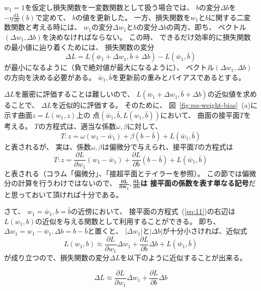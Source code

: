 $w_1 = 1$を仮定し損失関数を一変数関数として扱う場合では、
$b$の変分$\Delta b$を$-\eta\frac{dL}{db}(b)$で定めて、
$b$の値を更新した。
一方、損失関数を$w_1$と$b$に関する二変数関数と考える時には、
$w_1$の変分$\Delta w_1$と$b$の変分$\Delta b$の両方、即ち、
ベクトル$(\Delta w_1, \Delta b)$を決めなければならない。
この時、
できるだけ効率的に損失関数の最小値に辿り着くためには、
損失関数の変分
\[
  \Delta L = L(\bar w_1 + \Delta w_1, \bar b + \Delta b)
  - L(\bar w_1, \bar b)
\]
が最小になるように（負で絶対値が最大になるように）、
ベクトル$(\Delta w_1, \Delta b)$の方向を決める必要がある。
$\bar w_1, \bar b$を更新前の重みとバイアスであるとする。

$\Delta L$を厳密に評価することは難しいので、
$L(\bar w_1 + \Delta w_1, \bar b + \Delta b)$の近似値を求めることで、
$\Delta L$を近似的に評価する。
そのために、
図~\ref{fig:rss-weight-bias}~(a)に示す曲面$z = L(w_1, z)$上の
点$(\bar w_1, \bar b, L(w_1, \bar b))$において、
曲面の接平面$T$を考える。
$T$の方程式は、適当な係数$\omega, \beta$に対して、
\[
T: z = \omega (w_1 - \bar w_1) + \beta (b - \bar b) + L(\bar w_1, \bar b)
\]
と表されるが、
実は、係数$\omega, \beta$は偏微分で与えられ、接平面$T$の方程式は
\begin{equation}\label{eq:11}
  T: z = \frac{\partial L}{\partial w_1} (w_1 - \bar w_1)
  + \frac{\partial L}{\partial b} (b - \bar b) + L(\bar w_1, \bar b)
\end{equation}
と表される（コラム「偏微分」、「接超平面とテイラーを参照）。
この節では偏微分の計算を行うわけではないので、
\textbf{$\boldsymbol{\frac{\partial L}{\partial w_1}, \frac{\partial L}{\partial b}}$は
接平面の係数を表す単なる記号}だと思っておいて頂ければ十分である。

さて、
$w_1 = \bar w_1, b = \bar b$の近傍において、
接平面の方程式~(\ref{eq:11})の右辺は$L(w_1, b)$の近似を与える関数として利用することができる。
即ち、
$\Delta w_1 = w_1 - \bar w_1, \Delta b = b - \bar b$と置くと、
$\vert\Delta w_1\vert$と$\vert\Delta b\vert$が十分小さければ、近似式
\[
  L(w_1, b) \approx \frac{\partial L}{\partial w_1} \Delta w_1
  + \frac{\partial L}{\partial b} \Delta b + L(\bar w_1, \bar b)
\]
が成り立つので、損失関数の変分$\Delta L$を以下のように近似することが出来る。
\begin{screen}
\begin{equation}\label{eq:12}
  \Delta L \approx
  \frac{\partial L}{\partial w_1} \Delta w_1
  + \frac{\partial L}{\partial b} \Delta b
\end{equation}
\end{screen}

